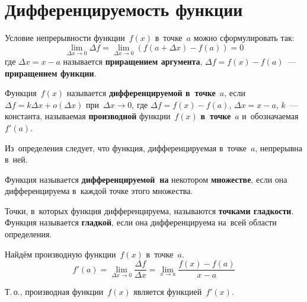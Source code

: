 \section{Дифференцируемость функции}
Условие непрерывности функции~$f(x)$ в~точке~$a$ можно сформулировать так:
\begin{equation*}
\lim_{\Delta x \to 0} \Delta f = \lim_{\Delta x \to 0} (f(a + \Delta x) - f(a)) = 0
\end{equation*}
где $\Delta x = x - a$ называется \textbf{приращением аргумента}, $\Delta f = f(x) - f(a)$~--- \textbf{приращением функции}.

\hypertarget{def:differentiability_of_function}{}\hypertarget{def:derivative_of_function}{} Функция~$f(x)$ называется \textbf{дифференцируемой в~точке}~$a$, если $\Delta f = k \Delta x + o(\Delta x)$ при~$\Delta x \to 0$, где $\Delta f = f(x) - f(a)$, $\Delta x = x - a$, $k$~--- константа, называемая \textbf{производной} функции~$f(x)$ \textbf{в~точке}~$a$ и~обозначаемая $f'(a)$.

Из~определения следует, что функция, дифференцируемая в~точке~$a$, непрерывна в~ней.

Функция называется \textbf{дифференцируемой~на} некотором \textbf{множестве}, если она дифференцируема в~каждой точке этого множества.

\hypertarget{def:smoothness_of_function}{} Точки, в~которых функция дифференцируема, называются \textbf{точками гладкости}.
Функция называется \textbf{гладкой}, если она дифференцируема на~всей области определения.

Найдём производную функции~$f(x)$ в~точке~$a$.
\begin{equation*}
f'(a) = \lim_{\Delta x \to 0} \frac{\Delta f}{\Delta x} = \lim_{x \to a} \frac{f(x) - f(a)}{x - a}
\end{equation*}

Т.\,о., производная функции~$f(x)$ является функцией~$f'(x)$.
